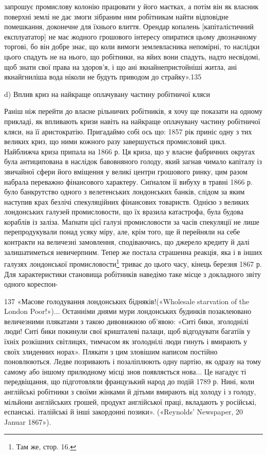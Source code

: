 запрошує промислову колонію працювати у його маєтках, а
потім він як власник поверхні землі не дає змоги зібраним ним
робітникам найти відповідне помешкання, доконечне для їхнього
влиття. Орендар копалень [капіталістичний експлуататор] не
має жодного грошового інтересу опиратися цьому двозначному
торгові, бо він добре знає, що коли вимоги землевласника непомірні,
то наслідки цього спадуть не на нього, що робітники, на
яйих вони спадуть, надто несвідомі, щоб знати свої права на здоров’я,
і що ані якнайнепристойніші житла, ані якнайгниліша
вода ніколи не будуть приводом до страйку».135

d) Вплив криз на найкраще оплачувану
частину робітничої кляси

Раніш ніж перейти до власне рільничих робітників, я хочу
ще показати на одному прикладі, як впливають кризи навіть на
найкраще оплачувану частину робітничої кляси, на її аристократію.
Пригадаймо собі ось що: 1857 рік приніс одну з тих
великих криз, що ними кожного разу завершується промисловий
цикл. Найближча криза припала на 1866 р. Ця криза, що у власне
фабричних округах була антиципована в наслідок бавовняного
голоду, який загнав чимало капіталу із звичайної сфери його
вміщення у великі центри грошового ринку, цим разом набрала
переважно фінансового характеру. Сиґналом її вибуху в травні
1866 р. було банкрутство одного з велетенських лондонських
банків, слідом за яким наступив крах безлічі спекуляційних
фінансових товариств. Однією з великих лондонських галузей
промисловости, що їх вразила катастрофа, була будова кораблів
із заліза. Маґнати цієї галузі промисловости за часів спекуляції
не лише перепродукували понад усяку міру, але, крім
того, ще й перейняли на себе контракти на величезні замовлення,
сподіваючись, що джерело кредиту й далі залишатиметься невичерпним.
Тепер же постала страшенна реакція, яка і в інших
галузях лондонської промисловости\footnote{
Там же, стор. 16.
} триває до цього часу,
кінець березня 1867 р. Для характеристики становища робітників
наведімо таке місце з докладного звіту одного кореспон-

137 «Масове голодування лондонських бідняків!(«Wholesale starvation
of the London Poor!»)... Останніми днями мури лондонських будинків
позаклеювано величезними плякатами з такою дивовижною об’явою:
«Ситі бики, зголоднілі люди! Ситі бики покинули свої кришталеві
палаци, щоб відгодувати багатіїв у їхніх розкішних світлицях, тимчасом
як зголоднілі люди гинуть і вмирають у своїх злиденних норах». Плякати
з цим зловішим написом постійно поновлюються. Ледве позривають і
позаліплюють одну партію, як одразу на тому самому або іншому прилюдному
місці знов появляється нова... Це нагадує ті передвіщання, що підготовляли
французький народ до подій 1789 р. Нині, коли англійські
робітники з своїми жінками й дітьми вмирають від холоду і з голоду,
мільйони англійських грошей, продукт англійської праці, вкладають
у російські, еспанські. італійські й інші закордонні позики». («Reynolds'
Newspaper, 20 Januar 1867»).
